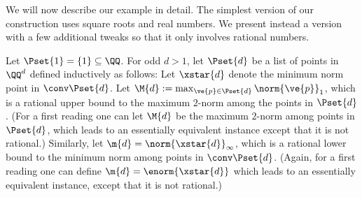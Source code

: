 



We will now describe our example in detail. The simplest version of our construction uses square roots and real numbers. We present instead a version with a few additional tweaks so that it only involves rational numbers.

Let $\Pset{1} = \{ 1\} \subseteq \QQ$. For odd $d >1$, let $\Pset{d}$ be a list of points in $\QQ^d$ defined inductively as follows: 
Let $\xstar{d}$ denote the minimum norm point in $\conv \Pset{d}$.  
Let $\M{d} := \max_{\ve{p} \in \Pset{d}} \norm{\ve{p}}_1$, which is a rational upper bound to the maximum $2$-norm among the points in $\Pset{d}$. 
(For a first reading one can let $\M{d}$ be the maximum $2$-norm among points in $\Pset{d}$, which leads to an essentially equivalent instance except that it is not rational.) 
Similarly, let $\m{d} = \norm{\xstar{d}}_\infty$, which is a rational lower bound to the minimum norm among points in $\conv \Pset{d}$. 
(Again, for a first reading one can define $\m{d} = \enorm{\xstar{d}}$ which leads to an essentially equivalent 
instance, except that it is not rational.) 

